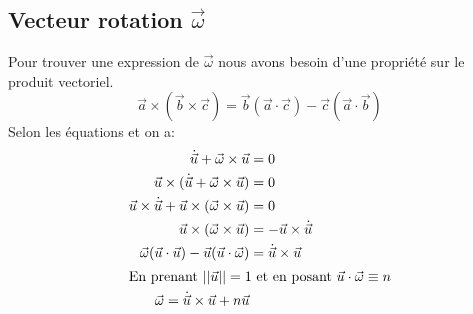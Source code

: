 \documentclass[12pt,a4paper]{article}
\makeatletter
\renewcommand*{\eqref}[1]{%
	\hyperref[{#1}]{\textup{\tagform@{\ref*{#1}}}}%
}
\makeatother
\begin{document}
	\subsection{Vecteur rotation $\vec{\omega}$}
	\label{subsec:omega}
	Pour trouver une expression de $\vec{\omega}$ nous avons besoin d'une propriété sur le produit vectoriel.
	\begin{equation}
	\vec{a}\times(\vec{b}\times\vec{c})=\vec{b}(\vec{a}\cdot\vec{c})-\vec{c}(\vec{a}\cdot\vec{b})
	\end{equation}
	Selon les équations \eqref{eq:bour} et \eqref{eq:uConstant} on a:
	\begin{align*}
	\dot{\vec{u}}+\vec{\omega}\times\vec{u}         &= 0\\
	\vec{u}\times(\dot{\vec{u}}+\vec{\omega}\times\vec{u})     &= 0\\
	\vec{u}\times\dot{\vec{u}}+\vec{u}\times(\vec{\omega}\times\vec{u})  &= 0\\
	\vec{u}\times(\vec{\omega}\times\vec{u})        &=-\vec{u}\times\dot{\vec{u}}\\
	\vec{\omega}(\vec{u}\cdot\vec{u})-\vec{u}(\vec{u}\cdot\vec{\omega})  &=\dot{\vec{u}}\times\vec{u}\\
	\intertext{En prenant $||\vec{u}||=1$ et en posant $\vec{u}\cdot\vec{\omega}\equiv n$}
	\vec{\omega}=\dot{\vec{u}}\times\vec{u}+n\vec{u}
	\end{align*}
	
\end{document}

